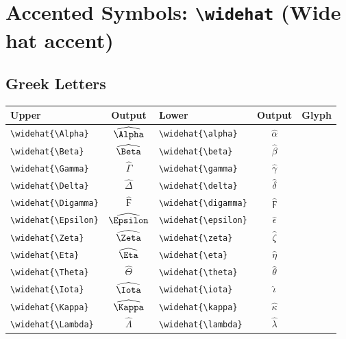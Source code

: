 \documentclass[12pt,a4paper]{article}
\begin{document}
\newpage

\section*{Accented Symbols: \texttt{\textbackslash widehat} (Wide hat accent)}

\subsection*{Greek Letters}
\begin{longtable}{|l|c|l|c|c|}
\hline
\textbf{Upper}               & \textbf{Output}      & \textbf{Lower}               & \textbf{Output}         & \textbf{Glyph} \\
\hline
\verb|\widehat{\Alpha}|      & $\widehat{\Alpha}$   & \verb|\widehat{\alpha}|      & $\widehat{\alpha}$      & \\
\verb|\widehat{\Beta}|       & $\widehat{\Beta}$    & \verb|\widehat{\beta}|       & $\widehat{\beta}$       & \\
\verb|\widehat{\Gamma}|      & $\widehat{\Gamma}$   & \verb|\widehat{\gamma}|      & $\widehat{\gamma}$      & \\
\verb|\widehat{\Delta}|      & $\widehat{\Delta}$   & \verb|\widehat{\delta}|      & $\widehat{\delta}$      & \\
\verb|\widehat{\Digamma}|    & $\widehat{\Digamma}$ & \verb|\widehat{\digamma}|    & $\widehat{\digamma}$    & \\
\verb|\widehat{\Epsilon}|    & $\widehat{\Epsilon}$ & \verb|\widehat{\epsilon}|    & $\widehat{\epsilon}$    & \\
\verb|\widehat{\Zeta}|       & $\widehat{\Zeta}$    & \verb|\widehat{\zeta}|       & $\widehat{\zeta}$       & \\
\verb|\widehat{\Eta}|        & $\widehat{\Eta}$     & \verb|\widehat{\eta}|        & $\widehat{\eta}$        & \\
\verb|\widehat{\Theta}|      & $\widehat{\Theta}$   & \verb|\widehat{\theta}|      & $\widehat{\theta}$      & \\
\verb|\widehat{\Iota}|       & $\widehat{\Iota}$    & \verb|\widehat{\iota}|       & $\widehat{\iota}$       & \\
\verb|\widehat{\Kappa}|      & $\widehat{\Kappa}$   & \verb|\widehat{\kappa}|      & $\widehat{\kappa}$      & \\
\verb|\widehat{\Lambda}|     & $\widehat{\Lambda}$  & \verb|\widehat{\lambda}|     & $\widehat{\lambda}$     & \\

\end{longtable}
\end{document}
